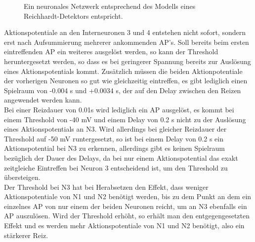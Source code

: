 \documentclass[11pt]{article}
\begin{document}
\begin{figure}[H]
\caption{Ein neuronales Netzwerk entsprechend des Modells eines Reichhardt-Detektors entspricht.}
\label{reich}
\end{figure}

Aktionspotentiale an den Interneuronen 3 und 4 entstehen nicht sofort, sondern erst nach Aufsummierung mehrerer ankommenden AP's. Soll bereits beim ersten eintreffenden AP ein weiteres ausgelöst werden, so kann der Threshold heruntergesetzt werden, so dass es bei geringerer Spannung bereits zur Auslösung eines Aktionspotentials kommt. Zusätzlich müssen die beiden Aktionpotentiale der vorherigen Neuronen so gut wie gleichzeitig eintreffen, es gibt lediglich einen Spielraum von -0.004 s und +0.0034 s, der auf den Delay zwischen den Reizen angewendet werden kann.\\
Bei einer Reizdauer von 0.01s wird lediglich ein AP ausgelöst, es kommt bei einem Threshold von -40 mV und einem Delay von 0.2 s nicht zu der Auslösung eines Aktionspotentials an N3. Wird allerdings bei gleicher Reizdauer der Threshold auf -50 mV runtergesetzt, so ist bei einem Delay von 0.2 s ein Aktionspotential bei N3 zu erkennen, allerdings gibt es keinen Spielraum bezüglich der Dauer des Delays, da bei nur einem Aktionspotential das exakt zeitgleiche Eintreffen bei Neuron 3 entscheidend ist, um den Threshold zu übersteigen.\\
Der Threshold bei N3 hat bei Herabsetzen den Effekt, dass weniger Aktionspotentiale von N1 und N2 benötigt werden, bis zu dem Punkt an dem ein einzelnes AP von nur einem der beiden Neuronen reicht, um an N3 ebenfalls ein AP auszulösen. Wird der Threshold erhöht, so erhält man den entgegengesetzten Effekt und es werden mehr Aktionspotentiale von N1 und N2 benötigt, also ein stärkerer Reiz.
\end{document}
